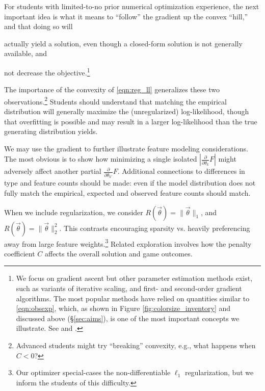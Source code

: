 \documentclass[11pt,letterpaper]{article}
\begin{document}
For students with limited-to-no prior numerical optimization experience, the next 
important idea is what it means to ``follow'' the gradient up the convex ``hill,'' and that doing so will 
\begin{inparaenum}[i)]
\item actually yield a solution, even though a closed-form solution is not generally available, and
\item not decrease the objective.\footnote{We focus on gradient ascent but other parameter estimation methods 
exist, such as variants of iterative scaling, and first- and second-order gradient algorithms. The most popular 
methods have relied on quantities similar to \eqref{eqn:obsexp}, which, as shown in Figure \ref{fig:colorsize_inventory} 
and discussed above (\S\ref{sec:aims}), is 
one of the most important concepts we illustrate. See 
 and . }
\end{inparaenum}
The importance of the convexity of \eqref{eqn:reg_ll} generalizes these two observations.\footnote{Advanced 
students might try ``breaking'' convexity, e.g., what happens when $C < 0$?}
Students should understand that matching the empirical distribution will generally maximize the (unregularized) log-likelihood, 
though that overfitting is possible and may result in a larger log-likelihood than the true generating distribution yields.

We may use the gradient to further illustrate feature modeling considerations. The most obvious is to show how 
minimizing a single isolated $|\frac{\partial}{\partial \theta_k} F|$ might adversely affect another partial 
$\frac{\partial}{\partial \theta_{k'}}F$. Additional connections to differences in type and feature counts should be 
made: even if the model distribution does not fully match the empirical, expected and observed feature 
counts should match.

When we include regularization, we consider $R(\vec{\theta}) = \|\vec\theta\|_1$, and 
$R(\vec{\theta}) = \|\vec{\theta}\|_2^2$. This contrasts encouraging sparsity vs.  
heavily preferencing away from large feature weights.\footnote{Our optimizer special-cases 
the non-differentiable $\ell_1$ regularization, but we inform the students of this difficulty.} 
Related exploration involves how the penalty coefficient $C$ affects the overall solution and game outcomes.
\end{document}
